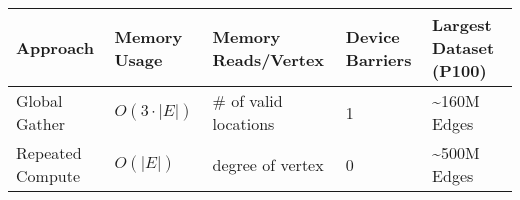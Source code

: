 \documentclass[10pt,oneside]{memoir}
\begin{document}
\begin{longtable}[]{@{}lllll@{}}
\toprule
\begin{minipage}[b]{0.16\columnwidth}\raggedright
Approach\strut
\end{minipage} & \begin{minipage}[b]{0.13\columnwidth}\raggedright
Memory Usage\strut
\end{minipage} & \begin{minipage}[b]{0.20\columnwidth}\raggedright
Memory Reads/Vertex\strut
\end{minipage} & \begin{minipage}[b]{0.15\columnwidth}\raggedright
Device Barriers\strut
\end{minipage} & \begin{minipage}[b]{0.22\columnwidth}\raggedright
Largest Dataset (P100)\strut
\end{minipage}\tabularnewline
\midrule
\endhead
\begin{minipage}[t]{0.16\columnwidth}\raggedright
Global Gather\strut
\end{minipage} & \begin{minipage}[t]{0.13\columnwidth}\raggedright
\(O(3 \cdot |E|)\)\strut
\end{minipage} & \begin{minipage}[t]{0.20\columnwidth}\raggedright
\# of valid locations\strut
\end{minipage} & \begin{minipage}[t]{0.15\columnwidth}\raggedright
1\strut
\end{minipage} & \begin{minipage}[t]{0.22\columnwidth}\raggedright
\textasciitilde{}160M Edges\strut
\end{minipage}\tabularnewline
\begin{minipage}[t]{0.16\columnwidth}\raggedright
Repeated Compute\strut
\end{minipage} & \begin{minipage}[t]{0.13\columnwidth}\raggedright
\(O(|E|)\)\strut
\end{minipage} & \begin{minipage}[t]{0.20\columnwidth}\raggedright
degree of vertex\strut
\end{minipage} & \begin{minipage}[t]{0.15\columnwidth}\raggedright
0\strut
\end{minipage} & \begin{minipage}[t]{0.22\columnwidth}\raggedright
\textasciitilde{}500M Edges\strut
\end{minipage}\tabularnewline
\bottomrule
\end{longtable}
\end{document}
